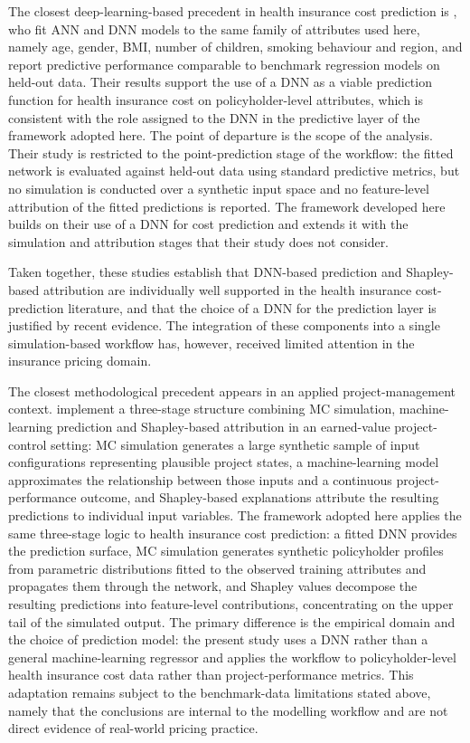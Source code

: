 \noindent
The closest deep-learning-based precedent in health insurance cost prediction
is \citet{samiuddin2023health}, who fit ANN and DNN models to the
same family of attributes used here, namely age, gender, BMI, number of
children, smoking behaviour and region, and report predictive performance
comparable to benchmark regression models on held-out data. Their results
support the use of a DNN as a viable prediction
function for health insurance cost on policyholder-level attributes, which is
consistent with the role assigned to the DNN in the predictive layer of
the framework adopted here. The point of departure is the scope of the
analysis. Their study is restricted to the point-prediction stage of the
workflow: the fitted network is evaluated against held-out data using standard
predictive metrics, but no simulation is conducted over a synthetic input
space and no feature-level attribution of the fitted predictions is reported.
The framework developed here builds on their use of a DNN for cost
prediction and extends it with the simulation and attribution stages that
their study does not consider.

\noindent
Taken together, these studies establish that DNN-based prediction and
Shapley-based attribution are individually well supported in the health
insurance cost-prediction literature, and that the choice of a DNN for
the prediction layer is justified by recent evidence.  The integration of
these components into a single simulation-based workflow has, however,
received limited attention in the insurance pricing domain.

\noindent
The closest methodological precedent appears in an applied
project-management context.  \citet{santos2023explainable} implement a
three-stage structure combining MC simulation, machine-learning
prediction and Shapley-based attribution in an earned-value
project-control setting: MC simulation generates a large synthetic
sample of input configurations representing plausible project states, a
machine-learning model approximates the relationship between those inputs
and a continuous project-performance outcome, and Shapley-based
explanations attribute the resulting predictions to individual input
variables.  The framework adopted here applies the same three-stage logic
to health insurance cost prediction: a fitted DNN provides the
prediction surface, MC simulation generates synthetic policyholder
profiles from parametric distributions fitted to the observed training
attributes and propagates them through the network, and Shapley values
decompose the resulting predictions into feature-level contributions,
concentrating on the upper tail of the simulated output.  The primary
difference is the empirical domain and the choice of prediction model: the
present study uses a DNN rather than a general machine-learning
regressor and applies the workflow to policyholder-level health insurance
cost data rather than project-performance metrics.  This adaptation remains
subject to the benchmark-data limitations stated above, namely that the
conclusions are internal to the modelling workflow and are not direct
evidence of real-world pricing practice.

